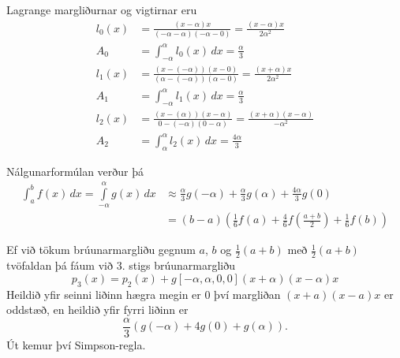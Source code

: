 \documentclass[icelandic,a4paper,12pt]{article}
\begin{document}
Lagrange margliðurnar og vigtirnar eru
\begin{align*}
  l_0(x) &= \frac{(x-\alpha)x}{(-\alpha-\alpha)(-\alpha - 0)} 
  = \frac{(x-\alpha)x}{2\alpha^2} \\
  A_0 &= \int_{-\alpha}^{\alpha} l_0(x)\,dx = \frac{\alpha}{3} \\
  l_1(x) &= \frac{(x-(-\alpha))(x-0)}{(\alpha - ( -\alpha))(\alpha - 0)}
  = \frac{(x+\alpha)x}{2\alpha^2}\\
  A_1 &= \int_{-\alpha}^{\alpha} l_1(x)\,dx = \frac{\alpha}{3}\\
  l_2(x) &= \frac{(x-(\alpha))(x-\alpha)}{0-(-\alpha)(0-\alpha)}
  = \frac{(x+\alpha)(x-\alpha)}{-\alpha^2}\\
  A_2 &= \int_{\alpha}^{\alpha} l_2(x)\,dx = \frac{4\alpha}{3}
\end{align*}



Nálgunarformúlan verður þá
\begin{align*}
  \int_a^b f(x) \, dx = \int\limits_{-\alpha}^{\alpha} g(x) \, dx
  &\approx \frac{\alpha}{3}g(-\alpha) + \frac{\alpha}{3}g(\alpha) 
  + \frac{4\alpha}{3}g(0)\\
  &=(b-a)\left( \frac{1}{6}f(a) + \frac{4}{6}f
    \left( \frac{a+b}{2}\right) + \frac{1}{6} f(b)  \right)
\end{align*}



Ef við tökum brúunarmargliðu gegnum $a$, $b$ og $\frac{1}{2}(a+b)$ með
$\frac{1}{2}(a+b)$ tvöfaldan þá fáum við 3. stigs brúunarmargliðu 
\begin{equation*}
  p_3(x) = p_2(x) + g[-\alpha, \alpha, 0, 0](x+\alpha)(x-\alpha)x
\end{equation*} \pause
Heildið yfir seinni liðinn hægra megin er 0 því 
margliðan $(x+a)(x-a)x$ er oddstæð, \pause
en heildið yfir 
fyrri liðinn er 
$$
  \frac \alpha3(g(-\alpha) + 4g(0) + g(\alpha)).
$$
\pause
Út kemur því Simpson-regla.  
\end{document}
